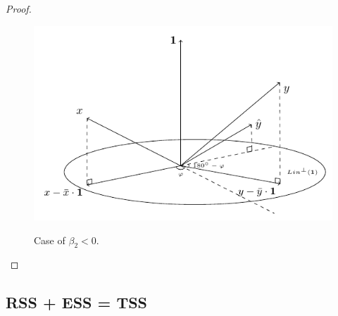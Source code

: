 \documentclass[nobib]{tufte-handout}
\theoremstyle{definition}
\begin{document}
\begin{proof}
\begin{figure}[h!]
\begin{center}
\includegraphics{images/corr_eq_negative.pdf}
\label{fig:corr_negative}
\caption{Case of $\beta_2 < 0$.}
\end{center}
\end{figure}
\end{proof}


\subsection{RSS + ESS = TSS}
\end{document}
